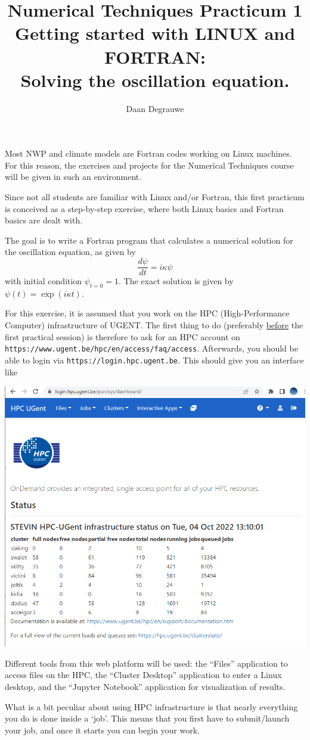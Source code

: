 \documentclass[a4paper]{article}
\title{%
	\bfseries%
	{\large Numerical Techniques Practicum 1}\\[3ex]
	{\Large Getting started with LINUX and FORTRAN:}\\[1ex]
	{\Large Solving the oscillation equation.}
}
\author{Daan Degrauwe}
\begin{document}
%
\maketitle
%
\par
Most NWP and climate models are Fortran codes working on Linux machines. For this reason, the exercises and projects for the Numerical Techniques course will be given in such an environment.
%
\par
Since not all students are familiar with Linux and/or Fortran, this first practicum is conceived as a step-by-step exercise, where both Linux basics and Fortran basics are dealt with.
%
\par
The goal is to write a Fortran program that calculates a numerical solution for the oscillation equation, as given by
%
\begin{equation*}
	\frac{d\psi}{dt}=i\kappa\psi
\end{equation*}
%
with initial condition $\psi_{t=0}=1$. The exact solution is given by $\psi(t)=\exp(i\kappa t)$.
%
\par
For this exercise, it is assumed that you work on the HPC (High-Performance Computer) infrastructure of UGENT. The first thing to do (preferably \underline{before} the first practical session) is therefore to ask for an HPC account on \texttt{https://www.ugent.be/hpc/en/access/faq/access}. Afterwards, you should be able to login via \texttt{https://login.hpc.ugent.be}. This should give you an interface like
%
\begin{center}
	\includegraphics[scale=.4]{login_hpc}
\end{center}
%
\par
Different tools from this web platform will be used: the ``Files'' application to access files on the HPC, the ``Cluster Desktop'' application to enter a Linux desktop, and the ``Jupyter Notebook'' application for visualization of results.
%
\par
What is a bit peculiar about using HPC infrastructure is that nearly everything you do is done inside a `job'. This means that you first have to submit/launch your job, and once it starts you can begin your work.
%
\end{document}
